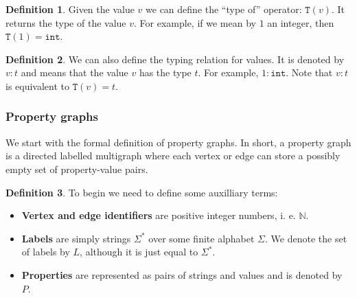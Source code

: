 \documentclass[14pt]{constructor-thesis}
\theoremstyle{definition}
\newtheorem*{definition}{Definition}
\begin{document}
\begin{definition}
  Given the value $v$ we can define the ``type of'' operator: $\mathtt{T}(v)$. It returns the type of the value $v$. For example, if we mean by $1$ an integer, then $\mathtt{T}(1) = \mathtt{int}$.
\end{definition}

\begin{definition}
  We can also define the typing relation for values. It is denoted by $v : t$ and means that the value $v$ has the type $t$. For example, $1 : \mathtt{int}$. Note that $v : t$ is equivalent to $\mathtt{T}(v) = t$.
\end{definition}

\subsubsection{Property graphs}

We start with the formal definition of property graphs. In short, a property graph is a directed labelled multigraph where each vertex or edge can store a possibly empty set of property-value pairs. 

\begin{definition}
  To begin we need to define some auxilliary terms: 
  \begin{itemize}
    \item \textbf{Vertex and edge identifiers} are positive integer numbers, i. e. $\mathbb{N}$.
    \item \textbf{Labels} are simply strings $\Sigma^*$ over some finite alphabet $\Sigma$. We denote the set of labels by $L$, although it is just equal to $\Sigma^*$.
    \item \textbf{Properties} are represented as pairs of strings and values and is denoted by $P$.
  \end{itemize}
\end{definition}
\end{document}
